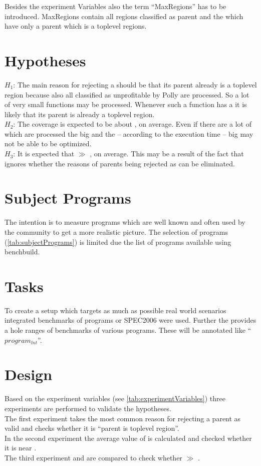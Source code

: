 Besides the experiment Variables also the term \enquote{MaxRegions} has to be introduced.
MaxRegions contain all regions classified as parent and the \scops which have only a parent which is a toplevel regions.

\section{Hypotheses}
\(H_1\): The main reason for rejecting a \scop should be that its parent already is a toplevel region because also all \scops classified as unprofitable by Polly are processed.
So a lot of very small functions may be processed.
Whenever such a function has a \scop it is likely that its parent is already a toplevel region.\\
\(H_2\): The coverage \dyncovs is expected to be about \hTwoAbout, on average.
Even if there are a lot of \scops which are processed the big \scops and the -- according to the execution time -- big \scops may not be able to be optimized.\\
\(H_3\): It is expected that \dyncovp \(\gg\) \dyncovs, on average.
This may be a result of the fact that \dyncovp ignores whether the reasons of parents being rejected as \scop can be eliminated.\\

\section{Subject Programs}
The intention is to measure programs which are well known and often used by the community to get a more realistic picture.
The selection of programs (\autoref{tab:subjectPrograms}) is limited due the list of programs available using benchbuild.

\section{Tasks}
To create a setup which targets as much as possible real world scenarios integrated benchmarks of programs or SPEC2006 were used.
Further the \lnt provides a hole ranges of benchmarks of various programs.
These will be annotated like \enquote{\(program_{lnt}\)}.

\section{Design}
Based on the experiment variables (see \autoref{tab:experimentVariables}) three experiments are performed to validate the hypotheses.\\
The first experiment takes the most common reason for rejecting a parent as valid \scop and checks whether it is \enquote{parent is toplevel region}.\\
In the second experiment the average value of \dyncovs is calculated and checked whether it is near \hTwoAbout.\\
The third experiment \dyncovp and \dyncovs are compared to check whether \dyncovp \(\gg\) \dyncovs.


